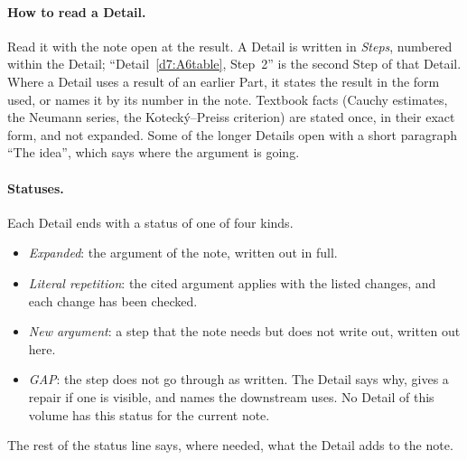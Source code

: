\paragraph{How to read a Detail.} Read it with the note open at the result. A Detail is written in \emph{Steps}, numbered within the Detail; ``Detail~\ref{d7:A6table}, Step~2'' is the second Step of that Detail. Where a Detail uses a result of an earlier Part, it states the result in the form used, or names it by its number in the note. Textbook facts (Cauchy estimates, the Neumann series, the Kotecký--Preiss criterion) are stated once, in their exact form, and not expanded. Some of the longer Details open with a short paragraph ``The idea'', which says where the argument is going.

\paragraph{Statuses.} Each Detail ends with a status of one of four kinds.
\begin{itemize}
\item \emph{Expanded}: the argument of the note, written out in full.
\item \emph{Literal repetition}: the cited argument applies with the listed changes, and each change has been checked.
\item \emph{New argument}: a step that the note needs but does not write out, written out here.
\item \emph{GAP}: the step does not go through as written. The Detail says why, gives a repair if one is visible, and names the downstream uses. No Detail of this volume has this status for the current note.
\end{itemize}
The rest of the status line says, where needed, what the Detail adds to the note.


